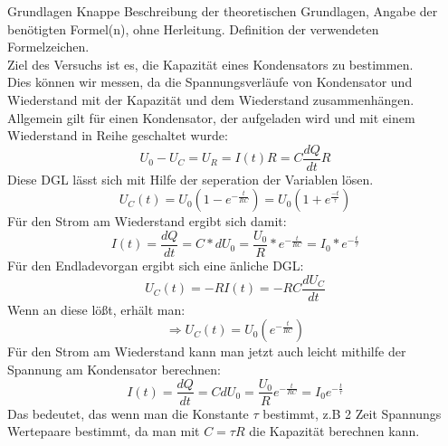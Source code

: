 \documentclass[twoside]{protokoll}
\begin{document}
\begin{aufgabe}{Grundlagen}
  Knappe Beschreibung der theoretischen Grundlagen, Angabe der
  benötigten Formel(n), ohne Herleitung. Definition der verwendeten
  Formelzeichen. \\


    Ziel des Versuchs ist es, die Kapazität eines Kondensators zu bestimmen.\\
    Dies können wir messen, da die Spannungsverläufe von Kondensator und Wiederstand mit der Kapazität und dem Wiederstand zusammenhängen.
    Allgemein gilt für einen Kondensator, der aufgeladen wird und mit einem Wiederstand in Reihe geschaltet wurde:
    \begin{equation}
        U_0 - U_C = U_R = I(t) R
        = C\frac{dQ}{dt} R
    \end{equation}
    Diese DGL lässt sich mit Hilfe der seperation der Variablen lösen.
    \begin{equation}
        U_C(t) = U_0 (1 - e^{-\frac{t}{RC}}) = U_0 (1 + e^{\frac{-t}{\tau}})
    \end{equation}
    Für den Strom am Wiederstand ergibt sich damit:
    \begin{equation}
        I(t) = \frac{dQ}{dt} = C * dU_0 = \frac{U_0}{R} * e^{-\frac{t}{RC}} = I_0 * e^{-\frac{t}{\tau}}
    \end{equation}
    Für den Endladevorgan ergibt sich eine änliche DGL:
    \begin{equation}
        U_C(t) = - R I(t)
        = - R C \frac{dU_C}{dt}
    \end{equation}
    Wenn an diese lößt, erhält man:
    \begin{equation}
        \Rightarrow U_C(t) = U_0 (e^{-\frac{t}{RC}})
    \end{equation}
    Für den Strom am Wiederstand kann man jetzt auch leicht mithilfe der Spannung am Kondensator berechnen:
    \begin{equation}
        I(t) = \frac{dQ}{dt} = C dU_0 = \frac{U_0}{R} e^{-\frac{t}{RC}} = I_0 e^{-\frac{t}{\tau}}
    \end{equation}
    Das bedeutet, das wenn man die Konstante $\tau$ bestimmt, z.B 2 Zeit Spannungs Wertepaare bestimmt, da man mit $C = \tau R$ die Kapazität berechnen kann.


\end{aufgabe}
\end{document}
